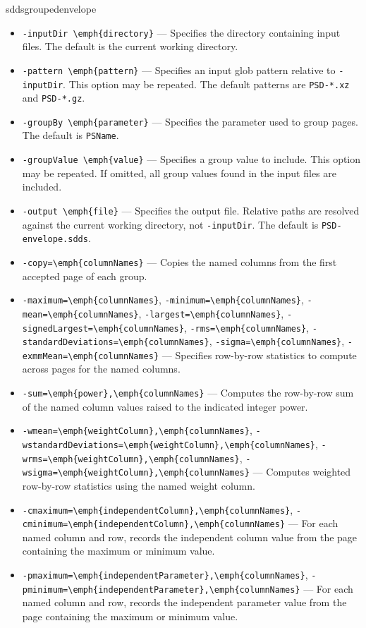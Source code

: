 \begin{sddsprog}{sddsgroupedenvelope}
\begin{itemize}
    \item \verb|-inputDir \emph{directory}| --- Specifies the directory containing input files. The default is the current working directory.
    \item \verb|-pattern \emph{pattern}| --- Specifies an input glob pattern relative to \verb|-inputDir|. This option may be repeated. The default patterns are \verb|PSD-*.xz| and \verb|PSD-*.gz|.
    \item \verb|-groupBy \emph{parameter}| --- Specifies the parameter used to group pages. The default is \verb|PSName|.
    \item \verb|-groupValue \emph{value}| --- Specifies a group value to include. This option may be repeated. If omitted, all group values found in the input files are included.
    \item \verb|-output \emph{file}| --- Specifies the output file. Relative paths are resolved against the current working directory, not \verb|-inputDir|. The default is \verb|PSD-envelope.sdds|.
    \item \verb|-copy=\emph{columnNames}| --- Copies the named columns from the first accepted page of each group.
    \item \verb|-maximum=\emph{columnNames}|, \verb|-minimum=\emph{columnNames}|, \verb|-mean=\emph{columnNames}|, \verb|-largest=\emph{columnNames}|, \verb|-signedLargest=\emph{columnNames}|, \verb|-rms=\emph{columnNames}|, \verb|-standardDeviations=\emph{columnNames}|, \verb|-sigma=\emph{columnNames}|, \verb|-exmmMean=\emph{columnNames}| --- Specifies row-by-row statistics to compute across pages for the named columns.
    \item \verb|-sum=\emph{power},\emph{columnNames}| --- Computes the row-by-row sum of the named column values raised to the indicated integer power.
    \item \verb|-wmean=\emph{weightColumn},\emph{columnNames}|, \verb|-wstandardDeviations=\emph{weightColumn},\emph{columnNames}|, \verb|-wrms=\emph{weightColumn},\emph{columnNames}|, \verb|-wsigma=\emph{weightColumn},\emph{columnNames}| --- Computes weighted row-by-row statistics using the named weight column.
    \item \verb|-cmaximum=\emph{independentColumn},\emph{columnNames}|, \verb|-cminimum=\emph{independentColumn},\emph{columnNames}| --- For each named column and row, records the independent column value from the page containing the maximum or minimum value.
    \item \verb|-pmaximum=\emph{independentParameter},\emph{columnNames}|, \verb|-pminimum=\emph{independentParameter},\emph{columnNames}| --- For each named column and row, records the independent parameter value from the page containing the maximum or minimum value.

\end{itemize}
\end{sddsprog}
